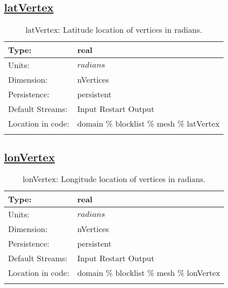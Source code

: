 \subsection[latVertex]{\hyperref[sec:var_tab_mesh]{latVertex}}
\label{subsec:var_sec_mesh_latVertex}
\begin{center}
\begin{longtable}{| p{2.0in} | p{4.0in} |}
        \hline 
        Type: & real \\
        \hline 
        Units: & $radians$ \\
        \hline 
        Dimension: & nVertices \\
        \hline 
        Persistence: & persistent \\
        \hline 
		 Default Streams: & Input Restart Output  \\
        \hline 
		 Location in code: & domain \% blocklist \% mesh \% latVertex \\
		 \hline 
    \caption{latVertex: Latitude location of vertices in radians.}
\end{longtable}
\end{center}
\subsection[lonVertex]{\hyperref[sec:var_tab_mesh]{lonVertex}}
\label{subsec:var_sec_mesh_lonVertex}
\begin{center}
\begin{longtable}{| p{2.0in} | p{4.0in} |}
        \hline 
        Type: & real \\
        \hline 
        Units: & $radians$ \\
        \hline 
        Dimension: & nVertices \\
        \hline 
        Persistence: & persistent \\
        \hline 
		 Default Streams: & Input Restart Output  \\
        \hline 
		 Location in code: & domain \% blocklist \% mesh \% lonVertex \\
		 \hline 
    \caption{lonVertex: Longitude location of vertices in radians.}
\end{longtable}
\end{center}
